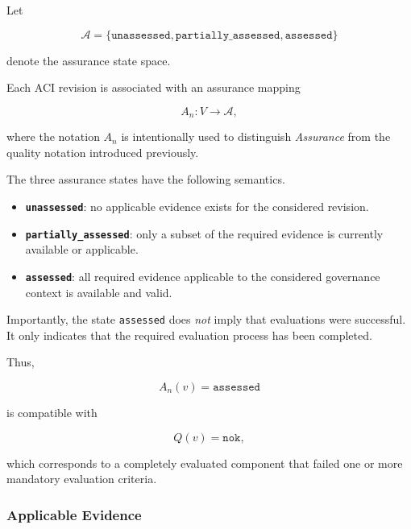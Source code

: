 \documentclass[10pt]{article}
\begin{document}
Let

\begin{equation}
\mathcal{A}
=
\{
\texttt{unassessed},
\texttt{partially\_assessed},
\texttt{assessed}
\}
\label{eq:assurance_states}
\end{equation}

denote the assurance state space.

Each ACI revision is associated with an assurance mapping

\begin{equation}
A_n :
V
\rightarrow
\mathcal{A},
\label{eq:assurance_mapping}
\end{equation}

where the notation \(A_n\) is intentionally used to distinguish
\emph{Assurance} from the quality notation introduced previously.

The three assurance states have the following semantics.

\begin{itemize}
    \item \textbf{\texttt{unassessed}}: no applicable evidence exists for the
    considered revision.

    \item \textbf{\texttt{partially\_assessed}}: only a subset of the required
    evidence is currently available or applicable.

    \item \textbf{\texttt{assessed}}: all required evidence applicable to the
    considered governance context is available and valid.
\end{itemize}

Importantly, the state
\texttt{assessed}
does \emph{not} imply that evaluations were successful.
It only indicates that the required evaluation process has been completed.

Thus,

\[
A_n(v)=\texttt{assessed}
\]

is compatible with

\[
Q(v)=\texttt{nok},
\]

which corresponds to a completely evaluated component that failed one or more
mandatory evaluation criteria.


\subsubsection{Applicable Evidence}
\end{document}
